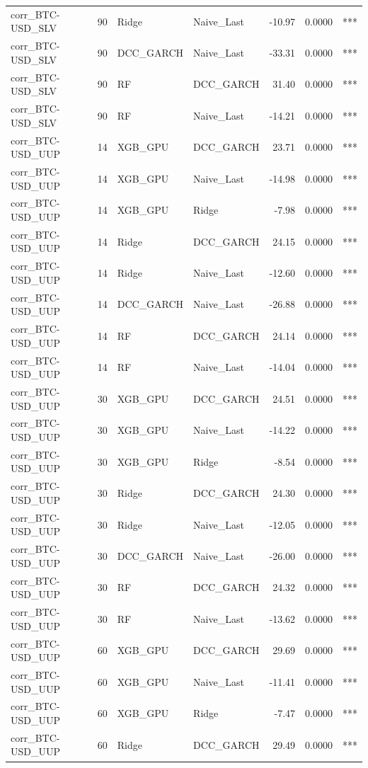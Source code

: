 \begin{table}[H]
\begin{tabular}{llllrrl}
corr_BTC-USD_SLV & 90 & Ridge & Naive_Last & -10.97 & 0.0000 & *** \\
corr_BTC-USD_SLV & 90 & DCC_GARCH & Naive_Last & -33.31 & 0.0000 & *** \\
corr_BTC-USD_SLV & 90 & RF & DCC_GARCH & 31.40 & 0.0000 & *** \\
corr_BTC-USD_SLV & 90 & RF & Naive_Last & -14.21 & 0.0000 & *** \\
corr_BTC-USD_UUP & 14 & XGB_GPU & DCC_GARCH & 23.71 & 0.0000 & *** \\
corr_BTC-USD_UUP & 14 & XGB_GPU & Naive_Last & -14.98 & 0.0000 & *** \\
corr_BTC-USD_UUP & 14 & XGB_GPU & Ridge & -7.98 & 0.0000 & *** \\
corr_BTC-USD_UUP & 14 & Ridge & DCC_GARCH & 24.15 & 0.0000 & *** \\
corr_BTC-USD_UUP & 14 & Ridge & Naive_Last & -12.60 & 0.0000 & *** \\
corr_BTC-USD_UUP & 14 & DCC_GARCH & Naive_Last & -26.88 & 0.0000 & *** \\
corr_BTC-USD_UUP & 14 & RF & DCC_GARCH & 24.14 & 0.0000 & *** \\
corr_BTC-USD_UUP & 14 & RF & Naive_Last & -14.04 & 0.0000 & *** \\
corr_BTC-USD_UUP & 30 & XGB_GPU & DCC_GARCH & 24.51 & 0.0000 & *** \\
corr_BTC-USD_UUP & 30 & XGB_GPU & Naive_Last & -14.22 & 0.0000 & *** \\
corr_BTC-USD_UUP & 30 & XGB_GPU & Ridge & -8.54 & 0.0000 & *** \\
corr_BTC-USD_UUP & 30 & Ridge & DCC_GARCH & 24.30 & 0.0000 & *** \\
corr_BTC-USD_UUP & 30 & Ridge & Naive_Last & -12.05 & 0.0000 & *** \\
corr_BTC-USD_UUP & 30 & DCC_GARCH & Naive_Last & -26.00 & 0.0000 & *** \\
corr_BTC-USD_UUP & 30 & RF & DCC_GARCH & 24.32 & 0.0000 & *** \\
corr_BTC-USD_UUP & 30 & RF & Naive_Last & -13.62 & 0.0000 & *** \\
corr_BTC-USD_UUP & 60 & XGB_GPU & DCC_GARCH & 29.69 & 0.0000 & *** \\
corr_BTC-USD_UUP & 60 & XGB_GPU & Naive_Last & -11.41 & 0.0000 & *** \\
corr_BTC-USD_UUP & 60 & XGB_GPU & Ridge & -7.47 & 0.0000 & *** \\
corr_BTC-USD_UUP & 60 & Ridge & DCC_GARCH & 29.49 & 0.0000 & *** \\

\end{tabular}
\end{table}
